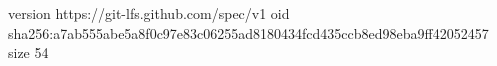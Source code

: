 version https://git-lfs.github.com/spec/v1
oid sha256:a7ab555abe5a8f0c97e83c06255ad8180434fcd435ccb8ed98eba9ff42052457
size 54
